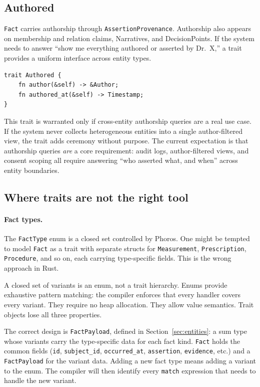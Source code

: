 \documentclass[11pt]{article}
\begin{document}
\subsection{Authored}
\label{sec:trait-authored}

\texttt{Fact} carries authorship through \texttt{AssertionProvenance}.
Authorship also appears on membership and relation claims, Narratives, and
DecisionPoints. If the system needs to answer ``show me
everything authored or asserted by Dr.~X,'' a trait provides a uniform
interface across entity types.

\begin{lstlisting}
trait Authored {
    fn author(&self) -> &Author;
    fn authored_at(&self) -> Timestamp;
}
\end{lstlisting}

This trait is warranted only if cross-entity authorship queries are a real
use case. If the system never collects heterogeneous entities into a single
author-filtered view, the trait adds ceremony without purpose. The
current expectation is that authorship queries \emph{are} a core
requirement: audit logs, author-filtered views, and consent scoping all
require answering ``who asserted what, and when'' across entity boundaries.


\subsection{Where traits are not the right tool}
\label{sec:traits-not}

\paragraph{Fact types.}
The \texttt{FactType} enum is a closed set controlled by Phoros. One might
be tempted to model \texttt{Fact} as a trait with separate structs for
\texttt{Measurement}, \texttt{Prescription}, \texttt{Procedure}, and so on,
each carrying type-specific fields. This is the wrong approach in Rust.

A closed set of variants is an enum, not a trait hierarchy. Enums provide
exhaustive pattern matching: the compiler enforces that every handler covers
every variant. They require no heap allocation. They allow value semantics.
Trait objects lose all three properties.

The correct design is \texttt{FactPayload}, defined in
Section~\ref{sec:entities}: a sum type whose variants carry the
type-specific data for each fact kind. \texttt{Fact} holds the common fields
(\texttt{id}, \texttt{subject\_id}, \texttt{occurred\_at},
\texttt{assertion}, \texttt{evidence}, etc.) and a \texttt{FactPayload} for the variant data.
Adding a new fact type means adding a variant to the enum. The compiler will
then identify every \texttt{match} expression that needs to handle the new
variant.
\end{document}
